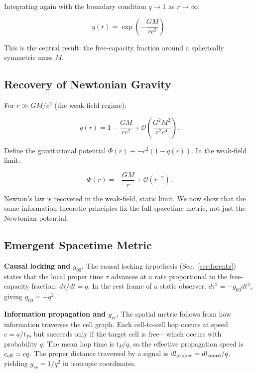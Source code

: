 \documentclass[aps,prd,twocolumn,showpacs,superscriptaddress,preprintnumbers]{revtex4-2}
\begin{document}
Integrating again with the boundary condition $q\to1$ as $r\to\infty$:

\begin{equation}
\boxed{q(r) = \exp\left(-\frac{GM}{rc^2}\right)}.
\label{eq:q_solution}
\end{equation}

This is the central result: the free-capacity fraction around a spherically symmetric mass $M$.

\subsection{Recovery of Newtonian Gravity}

For $r\gg GM/c^2$ (the weak-field regime):

\begin{equation}
q(r) = 1 - \frac{GM}{rc^2} + \mathcal{O}\left(\frac{G^2 M^2}{r^2 c^4}\right).
\label{eq:q_expand}
\end{equation}

Define the gravitational potential $\Phi(r)\equiv-c^2(1-q(r))$.
In the weak-field limit:

\begin{equation}
\boxed{\Phi(r) = -\frac{GM}{r} + \mathcal{O}(r^{-2})}.
\label{eq:newton}
\end{equation}

Newton's law is recovered in the weak-field, static limit.
We now show that the same information-theoretic principles fix the full spacetime metric, not just the Newtonian potential.

\subsection{Emergent Spacetime Metric}

\textbf{Causal locking and $g_{00}$.}
The causal locking hypothesis (Sec.~\ref{sec:lorentz}) states that the local proper time $\tau$ advances at a rate proportional to the free-capacity fraction: $d\tau/dt = q$.
In the rest frame of a static observer, $d\tau^2 = -g_{00}dt^2$, giving $g_{00} = -q^2$.

\textbf{Information propagation and $g_{rr}$.}
The spatial metric follows from how information traverses the cell graph.
Each cell-to-cell hop occurs at speed $c = a/t_P$, but succeeds only if the target cell is free---which occurs with probability $q$.
The mean hop time is $t_P/q$, so the effective propagation speed is $c_{\rm eff} = c q$.
The proper distance traversed by a signal is $dl_{\rm proper} = dl_{\rm coord}/q$, yielding $g_{rr} = 1/q^2$ in isotropic coordinates.
\end{document}
